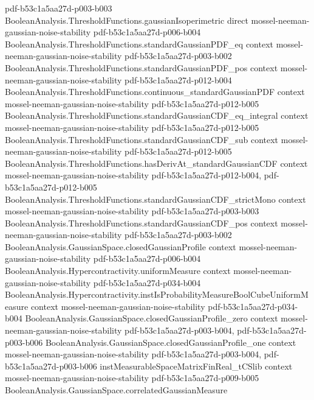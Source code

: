 \begin{theorem}
  {pdf-b53c1a5aa27d-p003-b003}
\proofstep
  {BooleanAnalysis.ThresholdFunctions.gaussianIsoperimetric}
  {direct}
  {mossel-neeman-gaussian-noise-stability}
  {pdf-b53c1a5aa27d-p006-b004}
\proofstep
  {BooleanAnalysis.ThresholdFunctions.standardGaussianPDF_eq}
  {context}
  {mossel-neeman-gaussian-noise-stability}
  {pdf-b53c1a5aa27d-p003-b002}
\proofstep
  {BooleanAnalysis.ThresholdFunctions.standardGaussianPDF_pos}
  {context}
  {mossel-neeman-gaussian-noise-stability}
  {pdf-b53c1a5aa27d-p012-b004}
\proofstep
  {BooleanAnalysis.ThresholdFunctions.continuous_standardGaussianPDF}
  {context}
  {mossel-neeman-gaussian-noise-stability}
  {pdf-b53c1a5aa27d-p012-b005}
\proofstep
  {BooleanAnalysis.ThresholdFunctions.standardGaussianCDF_eq_integral}
  {context}
  {mossel-neeman-gaussian-noise-stability}
  {pdf-b53c1a5aa27d-p012-b005}
\proofstep
  {BooleanAnalysis.ThresholdFunctions.standardGaussianCDF_sub}
  {context}
  {mossel-neeman-gaussian-noise-stability}
  {pdf-b53c1a5aa27d-p012-b005}
\proofstep
  {BooleanAnalysis.ThresholdFunctions.hasDerivAt_standardGaussianCDF}
  {context}
  {mossel-neeman-gaussian-noise-stability}
  {pdf-b53c1a5aa27d-p012-b004,
    pdf-b53c1a5aa27d-p012-b005}
\proofstep
  {BooleanAnalysis.ThresholdFunctions.standardGaussianCDF_strictMono}
  {context}
  {mossel-neeman-gaussian-noise-stability}
  {pdf-b53c1a5aa27d-p003-b003}
\proofstep
  {BooleanAnalysis.ThresholdFunctions.standardGaussianCDF_pos}
  {context}
  {mossel-neeman-gaussian-noise-stability}
  {pdf-b53c1a5aa27d-p003-b002}
\proofstep
  {BooleanAnalysis.GaussianSpace.closedGaussianProfile}
  {context}
  {mossel-neeman-gaussian-noise-stability}
  {pdf-b53c1a5aa27d-p006-b004}
\proofstep
  {BooleanAnalysis.Hypercontractivity.uniformMeasure}
  {context}
  {mossel-neeman-gaussian-noise-stability}
  {pdf-b53c1a5aa27d-p034-b004}
\proofstep
  {BooleanAnalysis.Hypercontractivity.instIsProbabilityMeasureBoolCubeUniformMeasure}
  {context}
  {mossel-neeman-gaussian-noise-stability}
  {pdf-b53c1a5aa27d-p034-b004}
\proofstep
  {BooleanAnalysis.GaussianSpace.closedGaussianProfile_zero}
  {context}
  {mossel-neeman-gaussian-noise-stability}
  {pdf-b53c1a5aa27d-p003-b004,
    pdf-b53c1a5aa27d-p003-b006}
\proofstep
  {BooleanAnalysis.GaussianSpace.closedGaussianProfile_one}
  {context}
  {mossel-neeman-gaussian-noise-stability}
  {pdf-b53c1a5aa27d-p003-b004,
    pdf-b53c1a5aa27d-p003-b006}
\proofstep
  {instMeasurableSpaceMatrixFinReal_tCSlib}
  {context}
  {mossel-neeman-gaussian-noise-stability}
  {pdf-b53c1a5aa27d-p009-b005}
\proofstep
  {BooleanAnalysis.GaussianSpace.correlatedGaussianMeasure}

\end{theorem}
